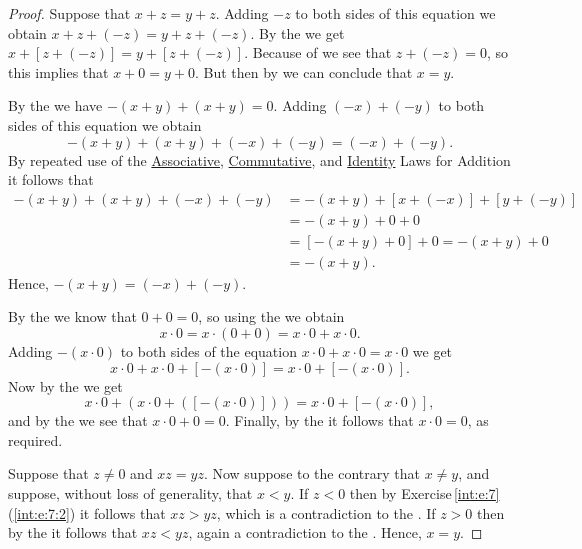 \begin{proof}
	\hfill

	\label{int:e:11:1}
	Suppose that $x + z = y + z$. Adding $-z$ to both sides of this equation we obtain $x + z + (-z) = y + z + (-z)$. By the  we get $x + [z + (-z)] = y + [z + (-z)]$. Because of  we see that $z + (-z) = 0$, so this implies that $x + 0 = y + 0$. But then by  we can conclude that $x = y$.

	By the  we have $-(x + y) + (x + y) = 0$. Adding $(-x) + (-y)$ to both sides of this equation we obtain \[
		-(x + y) + (x + y) + (-x) + (-y) = (-x) + (-y).
	\] By repeated use of the \hyperref[int:t:props:associative_add]{Associative}, \hyperref[int:t:props:commutative_add]{Commutative}, and \hyperref[int:t:props:identity_add]{Identity} Laws for Addition it follows that
	\begin{align*}
		-(x + y) + (x + y) + (-x) + (-y) & = -(x + y) + [x + (-x)] + [y + (-y)] \\
		                                 & = -(x + y) + 0 + 0                   \\
		                                 & = [-(x + y) + 0] + 0 = -(x + y) + 0  \\
		                                 & = -(x + y).
	\end{align*}
	Hence, $-(x + y) = (-x) + (-y)$.

	By the  we know that $0 + 0 = 0$, so using the  we obtain
	\[
		x \cdot 0 = x \cdot (0 + 0) = x \cdot 0 + x \cdot 0.
	\]
	Adding $-(x \cdot 0)$ to both sides of the equation $x \cdot 0 + x \cdot 0 = x \cdot 0$ we get
	\[
		x \cdot 0 + x \cdot 0 + [-(x \cdot 0)] = x \cdot 0 + [-(x \cdot 0)].
	\]
	Now by the  we get
	\[
		x \cdot 0 + (x \cdot 0 + ([-(x \cdot 0)])) = x \cdot 0 + [-(x \cdot 0)],
	\]
	and by the  we see that $x \cdot 0 + 0 = 0$. Finally, by the  it follows that $x \cdot 0 = 0$, as required.

	Suppose that $z \not= 0$ and $xz = yz$. Now suppose to the contrary that ${x \not= y}$, and suppose, without loss of generality, that $x < y$. If $z < 0$ then by Exercise\,\ref{int:e:7}\,(\ref{int:e:7:2}) it follows that $xz > yz$, which is a contradiction to the . If $z > 0$ then by the  it follows that $xz < yz$, again a contradiction to the . Hence, $x = y$.


\end{proof}
